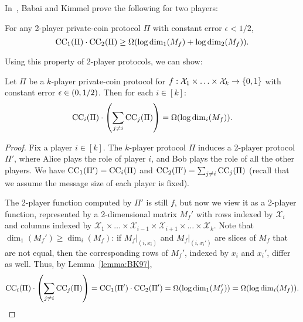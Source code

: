 In~\cite{BK97}, Babai and Kimmel prove the following for two players:
\begin{lemma}[\cite{BK97}]
	For any 2-player private-coin protocol $\Pi$ with constant error $\epsilon < 1/2$,
	\begin{equation*}
	\mathrm{CC}_1(\Pi) \cdot \mathrm{CC}_2(\Pi) \geq \Omega( \log \dim_1(M_f) + \log \dim_2(M_f) ).
	\end{equation*}
	\label{lemma:BK97}
\end{lemma}

Using this property of 2-player protocols, we can show:
\begin{lemma}
	Let $\Pi$ be a $k$-player private-coin protocol for $f : \mathcal{X}_1 \times \ldots \times \mathcal{X}_k \rightarrow \{ 0,1 \}$ with constant error $\epsilon \in (0,1/2)$.
	Then for each $i \in [k]$:
	\begin{equation*}
		\mathrm{CC}_i(\Pi) \cdot \left(\sum_{j \neq i} \mathrm{CC}_j(\Pi) \right) = \Omega( \log \dim_i(M_f) ).
	\end{equation*}
	\label{lemma:player_i_lower}
\end{lemma}
\begin{proof}
	Fix a player $i \in [k]$. The $k$-player protocol $\Pi$ induces a 2-player protocol $\Pi'$, where Alice plays the role of player $i$,
	and Bob plays the role of all the other players.
	We have $\mathrm{CC}_1(\Pi') = \mathrm{CC}_i(\Pi)$ and $\mathrm{CC}_2(\Pi') = \sum_{j \neq i} \mathrm{CC}_j(\Pi)$
	(recall that we assume the message size of each player is fixed).


	The 2-player function computed by $\Pi'$ is still $f$, but now we view it as a 2-player function,
	represented by a 2-dimensional matrix $M_f'$ with rows indexed by $\mathcal{X}_i$ and columns indexed by $\mathcal{X}_1 \times \ldots \times \mathcal{X}_{i-1} \times \mathcal{X}_{i+1} \times \ldots \times \mathcal{X}_k$.
	Note that $\dim_1(M_f') \geq \dim_i(M_f)$:
	if $M_f|_{(i,x_i)}$ and $M_f|_{(i,x_i')}$ are slices of $M_f$ that are not equal,
	then the corresponding rows of $M_f'$, indexed by $x_i$ and $x_i'$, differ as well.
	Thus, by Lemma~\ref{lemma:BK97},
	\begin{equation*}
		\mathrm{CC}_i(\Pi) \cdot \left(\sum_{j\neq i} \mathrm{CC}_j(\Pi) \right) = \mathrm{CC}_1(\Pi') \cdot \mathrm{CC}_2(\Pi') = \Omega(\log \dim_1(M_f')) = \Omega(\log \dim_i(M_f)).
	\end{equation*}
\end{proof}

